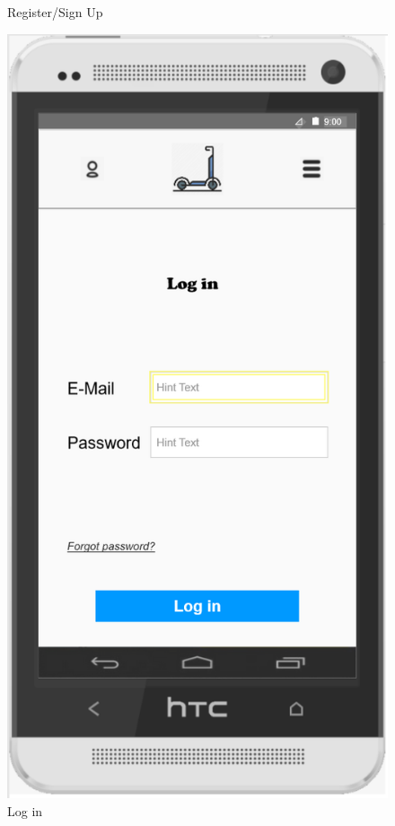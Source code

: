 \documentclass[a4paper, 12pt]{article}
\begin{document}
\begin{figure} [htbp]
\begin{center}
\begin{minipage}{0.45\textwidth}
\begin{center}
            \end{center}
            \caption{Register/Sign Up}
        \end{minipage}\hfill
        \begin{minipage}{0.45\textwidth}
            \begin{center}
                \includegraphics[scale=0.65]{images/prototypes/05-log-in.png}
            \end{center}
            \caption{Log in}
        \end{minipage}
    \end{center}
\end{figure}
\end{document}
